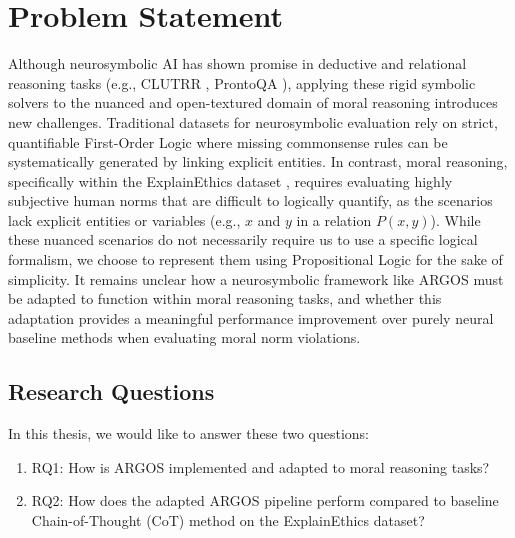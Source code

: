 \section{Problem Statement}
\label{sec:masalah}
Although neurosymbolic AI has shown promise in deductive and relational reasoning tasks (e.g., CLUTRR \citep{sinha-etal-2019-clutrr}, ProntoQA \citep{PrOntoQA}), applying these rigid symbolic solvers to the nuanced and open-textured domain of moral reasoning introduces new challenges. Traditional datasets for neurosymbolic evaluation rely on strict, quantifiable First-Order Logic where missing commonsense rules can be systematically generated by linking explicit entities. In contrast, moral reasoning, specifically within the ExplainEthics dataset \citep{quan-etal-2024-enhancing}, requires evaluating highly subjective human norms that are difficult to logically quantify, as the scenarios lack explicit entities or variables (e.g., $x$ and $y$ in a relation $P(x,y)$). While these nuanced scenarios do not necessarily require us to use a specific logical formalism, we choose to represent them using Propositional Logic for the sake of simplicity. It remains unclear how a neurosymbolic framework like ARGOS must be adapted to function within moral reasoning tasks, and whether this adaptation provides a meaningful performance improvement over purely neural baseline methods when evaluating moral norm violations.

\subsection{Research Questions}
\label{sec:definisiMasalah}
In this thesis, we would like to answer these two questions:
\begin{enumerate}
	\item RQ1: How is ARGOS implemented and adapted to moral reasoning tasks?
	\item RQ2: How does the adapted ARGOS pipeline perform compared to baseline Chain-of-Thought (CoT) method on the ExplainEthics dataset?
\end{enumerate}

